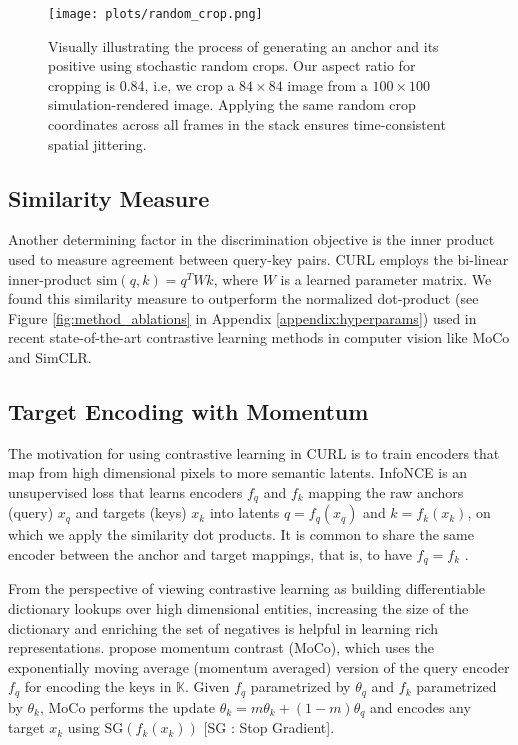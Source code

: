 \documentclass{article}
\begin{document}
\begin{figure}[ht]
\begin{center}
\centerline{\texttt{[image: plots/random\_crop.png]}}
\caption{Visually illustrating the process of generating an anchor and its positive using stochastic random crops. Our aspect ratio for cropping is 0.84, i.e, we crop a $84 \times 84$ image from a $100 \times 100$ simulation-rendered image. Applying the same random crop coordinates across all frames in the stack ensures time-consistent spatial jittering.}
\label{fig:random_crop}
\end{center}
\vskip -0.2in
\end{figure}
\vspace*{-4mm}
\subsection{Similarity Measure}

Another determining factor in the discrimination objective is the inner product used to measure agreement between query-key pairs. CURL employs the bi-linear inner-product $\text{sim}(q,k) = q^T W k$, where $W$ is a learned parameter matrix. We found this similarity measure to outperform the normalized dot-product (see Figure \ref{fig:method_ablations} in Appendix \ref{appendix:hyperparams}) used in recent state-of-the-art contrastive learning methods in computer vision like MoCo and SimCLR.

\vspace*{-2mm}
\subsection{Target Encoding with Momentum}

The motivation for using contrastive learning in CURL is to train encoders that map from high dimensional pixels to more semantic latents. InfoNCE is an unsupervised loss that learns encoders $f_q$ and $f_k$ mapping the raw anchors (query) $x_q$ and targets (keys) $x_k$ into latents $q = f_q(x_q)$ and $k = f_k(x_k)$, on which we apply the similarity dot products. It is common to share the same encoder between the anchor and target mappings, that is, to have $f_q = f_k$ \cite{oord2018representation, henaff2019data}. 

From the perspective of viewing contrastive learning as building differentiable dictionary lookups over high dimensional entities, increasing the size of the dictionary and enriching the set of negatives is helpful in learning rich representations. \citet{he2019momentum} propose momentum contrast (MoCo), which uses the exponentially moving average (momentum averaged) version of the query encoder $f_q$ for encoding the keys in $\mathbb{K}$. Given $f_q$ parametrized by $\theta_q$ and $f_k$ parametrized by $\theta_k$, MoCo performs the update $\theta_k = m \theta_k + (1 - m) \theta_q $ and encodes any target $x_k$ using $\textrm{SG}(f_k(x_k))$ [${\textrm{SG}}$ : Stop Gradient].
\end{document}
